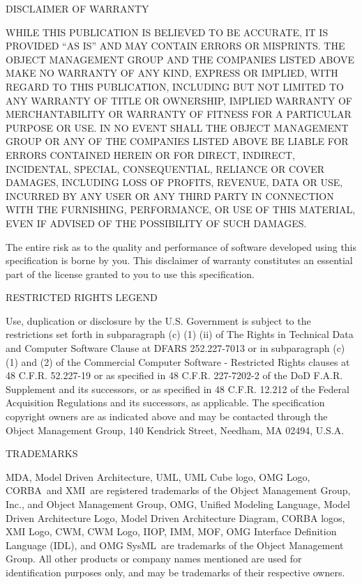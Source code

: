 \documentclass[10pt,%
\ifpretendfinal
final%
\else
draft%
\fi,
]{scrreprt}
\newcommand{\rtm}[0]{\small{\textregistered\xspace}}
\newcommand{\OMGparagraph}[1]{
\vspace{3pt}
{\centerline {#1}}
\vspace{3pt}
}
\begin{document}
\OMGparagraph{DISCLAIMER OF WARRANTY}
WHILE THIS PUBLICATION IS BELIEVED TO BE ACCURATE, IT IS PROVIDED ``AS IS'' AND MAY CONTAIN ERRORS OR MISPRINTS. THE OBJECT MANAGEMENT GROUP AND THE COMPANIES LISTED ABOVE MAKE NO WARRANTY OF ANY KIND, EXPRESS OR IMPLIED, WITH REGARD TO THIS PUBLICATION, INCLUDING BUT NOT LIMITED TO ANY WARRANTY OF TITLE OR OWNERSHIP, IMPLIED WARRANTY OF MERCHANTABILITY OR WARRANTY OF FITNESS FOR A PARTICULAR PURPOSE OR USE. 
IN NO EVENT SHALL THE OBJECT MANAGEMENT GROUP OR ANY OF THE COMPANIES LISTED ABOVE BE LIABLE FOR ERRORS CONTAINED HEREIN OR FOR DIRECT, INDIRECT, INCIDENTAL, SPECIAL, CONSEQUENTIAL, RELIANCE OR COVER DAMAGES, INCLUDING LOSS
 OF PROFITS, REVENUE, DATA OR USE, INCURRED BY ANY USER OR ANY THIRD PARTY IN CONNECTION WITH THE FURNISHING, PERFORMANCE, OR USE OF THIS MATERIAL, EVEN IF ADVISED OF THE POSSIBILITY OF SUCH DAMAGES. 

The entire risk as to the quality and performance of software developed using this specification is borne by you. This disclaimer of warranty constitutes an
 essential part of the license granted to you to use this specification.

\OMGparagraph{RESTRICTED RIGHTS LEGEND}
Use, duplication or disclosure by the U.S. Government  is subject to the restrictions set forth in subparagraph (c) (1) (ii) of The Rights in Technical Data and Computer Software Clause at DFARS 252.227-7013 or in subparagraph
 (c)(1) and (2) of the Commercial Computer Software - Restricted Rights clauses at 48 C.F.R. 52.227-19 or as specified in 48 C.F.R. 227-7202-2 of the DoD F.A.R. Supplement and its successors, or as specified in 48 C.F.R. 12.212 of
  the Federal Acquisition Regulations and its successors, as applicable. The specification copyright owners are as indicated above and may be contacted through the Object Management Group, 140 Kendrick Street, Needham, MA 02494, U.S.A.

\OMGparagraph{TRADEMARKS}
MDA\rtm, Model Driven Architecture\rtm, UML\rtm, UML Cube logo\rtm, OMG Logo\rtm, CORBA\rtm\ and XMI\rtm\ are registered trademarks of the Object Management Group, Inc., and Object Management Group\texttrademark\xspace, OMG\texttrademark\xspace , Unified Modeling Language\texttrademark\xspace, Model Driven Architecture Logo\texttrademark\xspace, Model Driven Architecture Diagram\texttrademark\xspace, CORBA logos\texttrademark\xspace, XMI Logo\texttrademark\xspace, CWM\texttrademark\xspace, CWM Logo\texttrademark\xspace, IIOP\texttrademark\xspace , IMM\texttrademark\xspace , MOF\texttrademark\xspace , OMG Interface Definition Language (IDL)\texttrademark\xspace , and OMG  SysML\texttrademark\xspace\   are trademarks of the Object Management Group. All other products or company names mentioned are used for identification purposes only, and may be trademarks of their respective owners.
\end{document}
